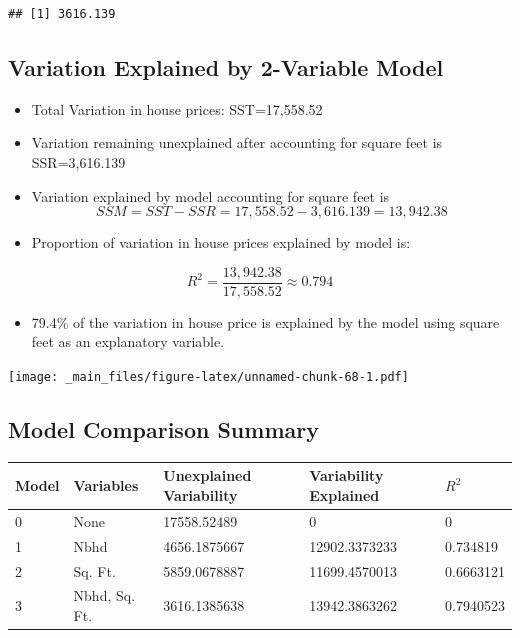 \documentclass[]{book}
\newenvironment{Shaded}{\begin{snugshade}}{\end{snugshade}}
\newcommand{\KeywordTok}[1]{\textcolor[rgb]{0.13,0.29,0.53}{\textbf{#1}}}
\newcommand{\DecValTok}[1]{\textcolor[rgb]{0.00,0.00,0.81}{#1}}
\newcommand{\OperatorTok}[1]{\textcolor[rgb]{0.81,0.36,0.00}{\textbf{#1}}}
\newcommand{\NormalTok}[1]{#1}
\providecommand{\tightlist}{%
  \setlength{\itemsep}{0pt}\setlength{\parskip}{0pt}}
\begin{document}
\begin{Shaded}
\end{Shaded}

\begin{verbatim}
## [1] 3616.139
\end{verbatim}

\subsection{Variation Explained by 2-Variable
Model}\label{variation-explained-by-2-variable-model}

\begin{itemize}
\item
  Total Variation in house prices: SST=17,558.52\\
\item
  Variation remaining unexplained after accounting for square feet is
  SSR=3,616.139\\
\item
  Variation explained by model accounting for square feet is
  \[SSM=SST-SSR=17,558.52 - 3,616.139 = 13,942.38\]
\item
  Proportion of variation in house prices explained by model is:
\end{itemize}

\[ R^2 = \frac{13,942.38}{17,558.52}\approx0.794 \]

\begin{itemize}
\tightlist
\item
  79.4\% of the variation in house price is explained by the model using
  square feet as an explanatory variable.
\end{itemize}

\texttt{[image: \_main\_files/figure-latex/unnamed-chunk-68-1.pdf]}

\subsection{Model Comparison Summary}\label{model-comparison-summary}

\begin{longtable}[]{@{}lllll@{}}
\toprule
Model & Variables & Unexplained Variability & Variability Explained &
\(R^2\)\tabularnewline
\midrule
\endhead
0 & None & 17558.52489 & 0 & 0\tabularnewline
1 & Nbhd & 4656.1875667 & 12902.3373233 & 0.734819\tabularnewline
2 & Sq. Ft. & 5859.0678887 & 11699.4570013 & 0.6663121\tabularnewline
3 & Nbhd, Sq. Ft. & 3616.1385638 & 13942.3863262 &
0.7940523\tabularnewline
\bottomrule
\end{longtable}
\end{document}
